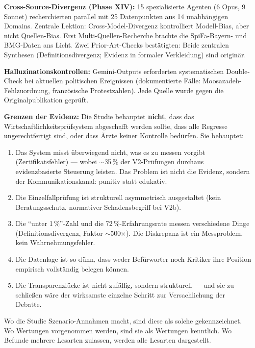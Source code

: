 \documentclass{umbruch-position}
\begin{document}
\textbf{Cross-Source-Divergenz (Phase XIV):} 15 spezialisierte Agenten (6 Opus, 9 Sonnet) recherchierten parallel mit 25 Datenpunkten aus 14 unabh\"angigen Domains. Zentrale Lektion: Cross-Model-Divergenz kontrolliert Modell-Bias, aber nicht Quellen-Bias. Erst Multi-Quellen-Recherche brachte die SpiFa-Bayern- und BMG-Daten ans Licht. Zwei Prior-Art-Checks best\"atigten: Beide zentralen Synthesen (Definitionsdivergenz; Evidenz in formaler Verkleidung) sind origin\"ar.

\textbf{Halluzinationskontrollen:} Gemini-Outputs erforderten systematischen Double-Check bei aktuellen politischen Ereignissen (dokumentierte F\"alle: Moosazadeh-Fehlzuordnung, franz\"osische Protestzahlen). Jede Quelle wurde gegen die Originalpublikation gepr\"uft.

\textbf{Grenzen der Evidenz:} Die Studie behauptet \textbf{nicht}, dass das Wirtschaftlichkeitspr\"ufsystem abgeschafft werden sollte, dass alle Regresse ungerechtfertigt sind, oder dass \"Arzte keiner Kontrolle bed\"urfen. Sie behauptet:

\begin{enumerate}
  \item Das System misst \"uberwiegend nicht, was es zu messen vorgibt (Zertifikatsfehler) --- wobei ${\sim}$35\,\% der V2-Pr\"ufungen durchaus evidenzbasierte Steuerung leisten. Das Problem ist nicht die Evidenz, sondern der Kommunikationskanal: punitiv statt edukativ.
  \item Die Einzelfallpr\"ufung ist strukturell asymmetrisch ausgestaltet (kein Beratungsschutz, normativer Schadensbegriff bei V2b).
  \item Die ``unter 1\,\%''-Zahl und die 72\,\%-Erfahrungsrate messen verschiedene Dinge (Definitionsdivergenz, Faktor ${\sim}$500$\times$). Die Diskrepanz ist ein Messproblem, kein Wahrnehmungsfehler.
  \item Die Datenlage ist so d\"unn, dass weder Bef\"urworter noch Kritiker ihre Position empirisch vollst\"andig belegen k\"onnen.
  \item Die Transparenzl\"ucke ist nicht zuf\"allig, sondern strukturell --- und sie zu schlie\ss{}en w\"are der wirksamste einzelne Schritt zur Versachlichung der Debatte.
\end{enumerate}

Wo die Studie Szenario-Annahmen macht, sind diese als solche gekennzeichnet. Wo Wertungen vorgenommen werden, sind sie als Wertungen kenntlich. Wo Befunde mehrere Lesarten zulassen, werden alle Lesarten dargestellt.
\end{document}
